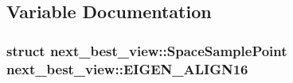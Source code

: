 \subsection{\-Variable \-Documentation}
\hypertarget{namespacenext__best__view_af60a57187270f681b59fceee92caa00b}{
\subsubsection[{\-E\-I\-G\-E\-N\-\_\-\-A\-L\-I\-G\-N16}]{\setlength{\rightskip}{0pt plus 5cm}struct {\bf next\-\_\-best\-\_\-view\-::\-Space\-Sample\-Point} {\bf next\-\_\-best\-\_\-view\-::\-E\-I\-G\-E\-N\-\_\-\-A\-L\-I\-G\-N16}}}\label{namespacenext__best__view_af60a57187270f681b59fceee92caa00b}
